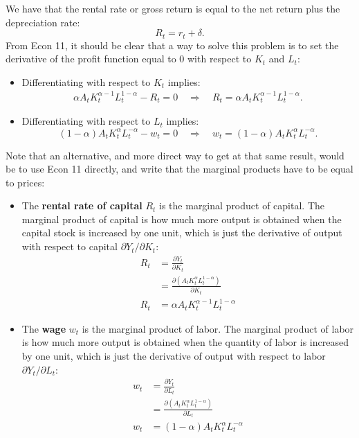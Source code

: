 \documentclass[]{book}
\providecommand{\tightlist}{%
  \setlength{\itemsep}{0pt}\setlength{\parskip}{0pt}}
\begin{document}
We have that the rental rate or gross return is equal to the net return
plus the depreciation rate: \[\boxed{R_t = r_t + \delta}.\] From Econ
11, it should be clear that a way to solve this problem is to set the
derivative of the profit function equal to \(0\) with respect to \(K_t\)
and \(L_t\):

\begin{itemize}
\tightlist
\item
  Differentiating with respect to \(K_t\) implies: \[
  \begin{aligned}
  \alpha A_t K_t^{\alpha-1} L_t^{1-\alpha} - R_t = 0 \quad \Rightarrow \quad \boxed{R_t = \alpha A_t K_t^{\alpha-1} L_t^{1-\alpha}}.
  \end{aligned}
  \]
\item
  Differentiating with respect to \(L_t\) implies:
  \[(1-\alpha) A_t K_t^{\alpha} L_t^{-\alpha} - w_t = 0 \quad \Rightarrow \quad \boxed{w_t = (1-\alpha) A_t K_t^{\alpha} L_t^{-\alpha}}.\]
\end{itemize}

Note that an alternative, and more direct way to get at that same
result, would be to use Econ 11 directly, and write that the marginal
products have to be equal to prices:

\begin{itemize}
\tightlist
\item
  The \textbf{rental rate of capital} \(R_t\) is the marginal product of
  capital. The marginal product of capital is how much more output is
  obtained when the capital stock is increased by one unit, which is
  just the derivative of output with respect to capital
  \(\partial Y_t / \partial K_t\): \[
  \begin{aligned}
  R_t&=\frac{\partial Y_t}{\partial K_t}\\
  &= \frac{\partial \left(A_t K_t^{\alpha} L_t^{1-\alpha}\right)}{\partial K_t}\\
  R_t &= \alpha A_t K_t^{\alpha-1} L_t^{1-\alpha}
  \end{aligned}
  \]
\item
  The \textbf{wage} \(w_t\) is the marginal product of labor. The
  marginal product of labor is how much more output is obtained when the
  quantity of labor is increased by one unit, which is just the
  derivative of output with respect to labor
  \(\partial Y_t / \partial L_t\): \[
  \begin{aligned}
  w_t &=\frac{\partial Y_t}{\partial L_t}\\
  &= \frac{\partial \left(A_t K_t^{\alpha} L_t^{1-\alpha}\right)}{\partial L_t}\\
  w_t &= (1-\alpha) A_t K_t^{\alpha} L_t^{-\alpha}
  \end{aligned}
  \]
\end{itemize}
\end{document}
